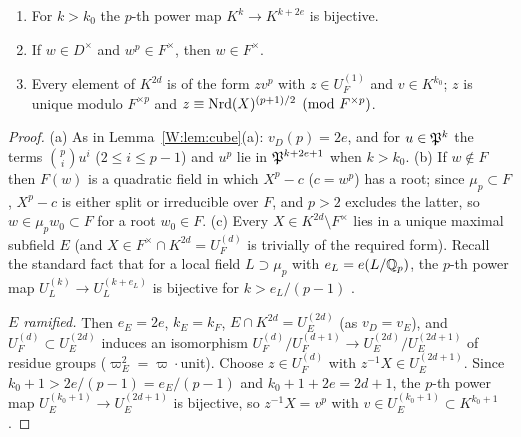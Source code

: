 \begin{lemma}\label{W:lem:depth-gen}
\begin{enumerate}[label=(\alph*)]
\item For $k>k_0$ the $p$-th power map $K^k\to K^{k+2e}$ is bijective.
\item If $w\in D^\times$ and $w^p\in F^\times$, then $w\in F^\times$.
\item Every element of $K^{2d}$ is of the form $zv^p$ with
$z\in U_F^{(1)}$ and $v\in K^{k_0}$; $z$ is unique modulo $F^{\times p}$
and $z\equiv\operatorname{Nrd}(X)^{(p+1)/2}\pmod{F^{\times p}}$.
\end{enumerate}
\end{lemma}
\begin{proof}
(a) As in Lemma~\ref{W:lem:cube}(a): $v_D(p)=2e$, and for $u\in\mathfrak P^k$ the
terms $\binom pi u^i$ ($2\le i\le p-1$) and $u^p$ lie in $\mathfrak P^{k+2e+1}$
when $k>k_0$.  (b) If $w\notin F$ then $F(w)$ is a quadratic field in
which $X^p-c$ ($c=w^p$) has a root; since $\mu_p\subset F$, $X^p-c$ is
either split or irreducible over $F$, and $p>2$ excludes the latter, so
$w\in\mu_pw_0\subset F$ for a root $w_0\in F$.  (c) Every $X\in K^{2d}\setminus F^\times$
lies in a unique maximal subfield $E$ (and $X\in F^\times\cap K^{2d}=U_F^{(d)}$
is trivially of the required form).  Recall the standard fact that for a
local field $L\supset\mu_p$ with $e_L=e(L/\mathbb Q_p)$, the $p$-th power map
$U^{(k)}_L\to U^{(k+e_L)}_L$ is bijective for $k>e_L/(p-1)$ \cite[Ch.~I]{FV02}.

\emph{$E$ ramified.}  Then $e_E=2e$, $k_E=k_F$, $E\cap K^{2d}=U_E^{(2d)}$
(as $v_D=v_E$), and $U_F^{(d)}\subset U_E^{(2d)}$ induces an isomorphism
$U_F^{(d)}/U_F^{(d+1)}\to U_E^{(2d)}/U_E^{(2d+1)}$ of residue groups
($\varpi_E^2=\varpi\cdot$unit).  Choose $z\in U_F^{(d)}$ with
$z^{-1}X\in U_E^{(2d+1)}$.  Since $k_0+1>2e/(p-1)=e_E/(p-1)$ and
$k_0+1+2e=2d+1$, the $p$-th power map $U_E^{(k_0+1)}\to U_E^{(2d+1)}$ is
bijective, so $z^{-1}X=v^p$ with $v\in U_E^{(k_0+1)}\subset K^{k_0+1}$.


\end{proof}
